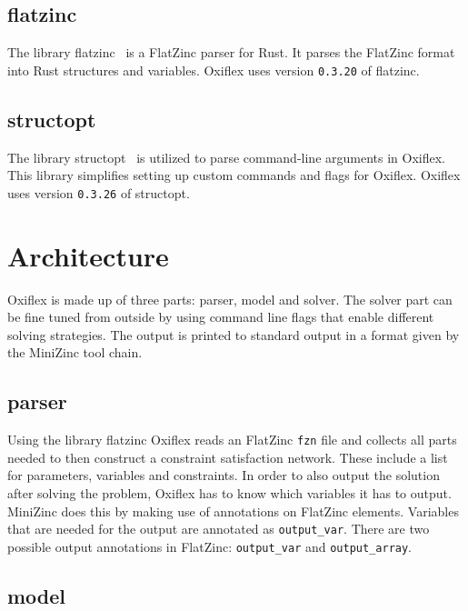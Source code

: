 \subsection{flatzinc} \label{flatzinc}

The library flatzinc~\cite{flatzinc:2020} is a FlatZinc parser for Rust. It parses the FlatZinc format into Rust structures and variables. Oxiflex uses version \verb|0.3.20| of flatzinc.

\subsection{structopt}

The library structopt~\cite{structopt:2020} is utilized to parse command-line arguments in Oxiflex. This library simplifies setting up custom commands and flags for Oxiflex. Oxiflex uses version \verb|0.3.26| of structopt.

\section{Architecture}

Oxiflex is made up of three parts: parser, model and solver. The solver part can be fine tuned from outside by using command line flags that enable different solving strategies. The output is printed to standard output in a format given by the MiniZinc tool chain.

\subsection{parser}

Using the library flatzinc Oxiflex reads an FlatZinc \verb|fzn| file and collects all parts needed to then construct a constraint satisfaction network. These include a list for parameters, variables and constraints. In order to also output the solution after solving the problem, Oxiflex has to know which variables it has to output. MiniZinc does this by making use of annotations on FlatZinc elements. Variables that are needed for the output are annotated as \verb|output_var|. There are two possible output annotations in FlatZinc: \verb|output_var| and \verb|output_array|.

\subsection{model} \label{model}

